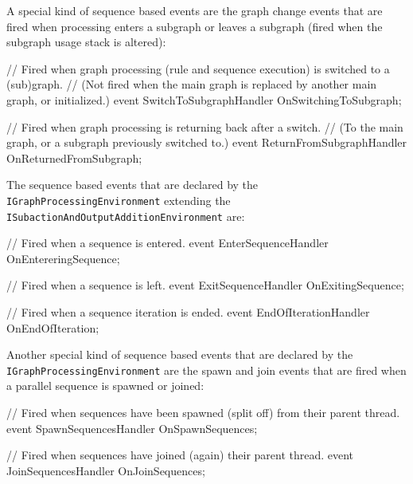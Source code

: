A special kind of sequence based events are the graph change events that are fired when processing enters a subgraph or leaves a subgraph (fired when the subgraph usage stack is altered):

\begin{csharplet}
// Fired when graph processing (rule and sequence execution) is switched to a (sub)graph.
// (Not fired when the main graph is replaced by another main graph, or initialized.)
event SwitchToSubgraphHandler OnSwitchingToSubgraph;

// Fired when graph processing is returning back after a switch.
// (To the main graph, or a subgraph previously switched to.)
event ReturnFromSubgraphHandler OnReturnedFromSubgraph;
\end{csharplet}

The sequence based events that are declared by the \texttt{IGraph\-Processing\-Environment} extending the \texttt{ISubaction\-And\-Output\-Addition\-Environment} are:

\begin{csharplet}
// Fired when a sequence is entered.
event EnterSequenceHandler OnEntereringSequence;

// Fired when a sequence is left.
event ExitSequenceHandler OnExitingSequence;

// Fired when a sequence iteration is ended.
event EndOfIterationHandler OnEndOfIteration;
\end{csharplet}

Another special kind of sequence based events that are declared by the \texttt{IGraph\-Processing\-Environment} are the spawn and join events that are fired when a parallel sequence is spawned or joined:

\begin{csharplet}
// Fired when sequences have been spawned (split off) from their parent thread.
event SpawnSequencesHandler OnSpawnSequences;

// Fired when sequences have joined (again) their parent thread.
event JoinSequencesHandler OnJoinSequences;
\end{csharplet}
